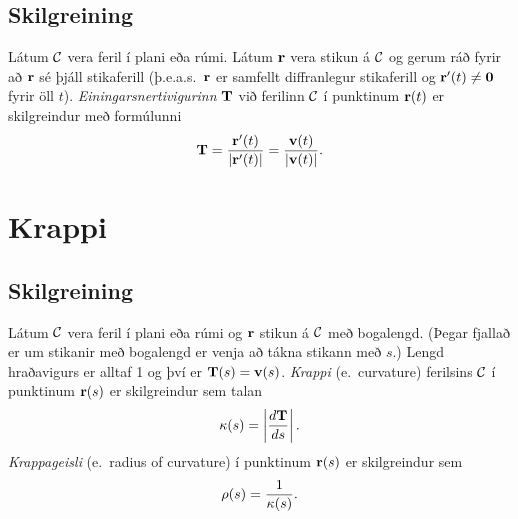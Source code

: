 \documentclass[a4paper,10pt,icelandic]{sphinxmanual}
\begin{document}
\subsection{Skilgreining}
\label{Kafli1:index-13}\label{Kafli1:id14}
Látum \(\cal C\) vera feril í plani eða rúmi. Látum
\(\mbox{${\bf r}$}\) vera stikun á \(\cal C\) og gerum ráð fyrir
að \(\mbox{${\bf r}$}\) sé þjáll stikaferill
(þ.e.a.s. \(\mbox{${\bf r}$}\) er samfellt diffranlegur stikaferill
og \(\mbox{${\bf r}$}'(t)\neq \mbox{${\bf 0}$}\) fyrir öll
\(t\)). \emph{Einingarsnertivigurinn} \(\mbox{${\bf T}$}\) við
ferilinn \(\cal C\) í punktinum \(\mbox{${\bf r}$}(t)\) er
skilgreindur með formúlunni
\begin{gather}
\begin{split}\displaystyle \mbox{${\bf T}$}=\frac{\mbox{${\bf r}$}'(t)}{|\mbox{${\bf r}$}'(t)|}=\frac{\mbox{${\bf v}$}(t)}{|\mbox{${\bf v}$}(t)|}.\end{split}\notag
\end{gather}

\section{Krappi}
\label{Kafli1:krappi}

\subsection{Skilgreining}
\label{Kafli1:index-14}\label{Kafli1:id15}
Látum \(\cal C\) vera feril í plani eða rúmi og
\(\mbox{${\bf r}$}\) stikun á \(\cal C\) með bogalengd. (Þegar
fjallað er um stikanir með bogalengd er venja að tákna stikann með
\(s\).) Lengd hraðavigurs er alltaf 1 og því er
\(\mbox{${\bf T}$}(s)=\mbox{${\bf v}$}(s)\). \emph{Krappi} (e. curvature)
ferilsins \(\cal
C\) í punktinum \(\mbox{${\bf r}$}(s)\) er skilgreindur sem talan
\begin{gather}
\begin{split}\displaystyle \kappa(s)=\left|\frac{d\mbox{${\bf T}$}}{ds}\right|.\end{split}\notag
\end{gather}
\emph{Krappageisli} (e. radius of curvature) í punktinum
\(\mbox{${\bf r}$}(s)\) er skilgreindur sem
\begin{gather}
\begin{split}\displaystyle \rho(s)=\frac{1}{\kappa(s)}.\end{split}\notag
\end{gather}
\end{document}

